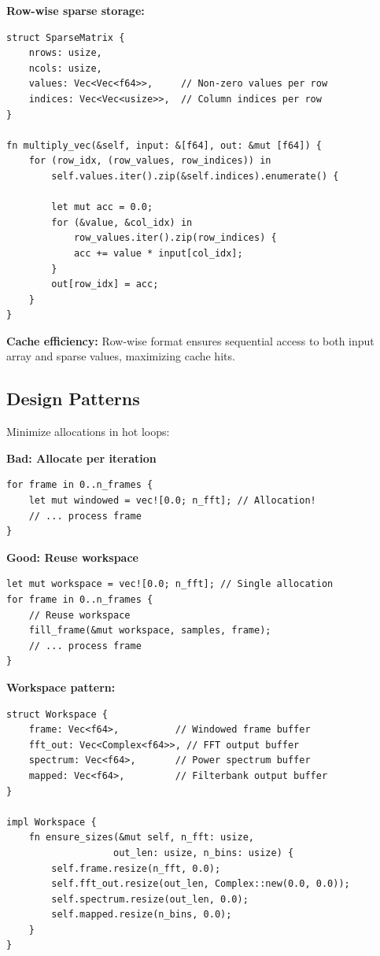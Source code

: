 \textbf{Row-wise sparse storage:}

\begin{lstlisting}[caption={Sparse matrix layout and filterbank multiply}]
struct SparseMatrix {
    nrows: usize,
    ncols: usize,
    values: Vec<Vec<f64>>,     // Non-zero values per row
    indices: Vec<Vec<usize>>,  // Column indices per row
}

fn multiply_vec(&self, input: &[f64], out: &mut [f64]) {
    for (row_idx, (row_values, row_indices)) in
        self.values.iter().zip(&self.indices).enumerate() {

        let mut acc = 0.0;
        for (&value, &col_idx) in
            row_values.iter().zip(row_indices) {
            acc += value * input[col_idx];
        }
        out[row_idx] = acc;
    }
}
\end{lstlisting}

\textbf{Cache efficiency:} Row-wise format ensures sequential access
to both input array and sparse values, maximizing cache hits.

\subsection{ Design Patterns}

Minimize allocations in hot loops:

\textbf{Bad: Allocate per iteration}
\begin{lstlisting}[caption={Per-frame allocation — wasteful hot-loop pattern}]
for frame in 0..n_frames {
    let mut windowed = vec![0.0; n_fft]; // Allocation!
    // ... process frame
}
\end{lstlisting}

\textbf{Good: Reuse workspace}
\begin{lstlisting}[caption={Pre-allocated workspace reused across frames}]
let mut workspace = vec![0.0; n_fft]; // Single allocation
for frame in 0..n_frames {
    // Reuse workspace
    fill_frame(&mut workspace, samples, frame);
    // ... process frame
}
\end{lstlisting}

\textbf{Workspace pattern:}

\begin{lstlisting}[caption={Full workspace struct with resizable buffers}]
struct Workspace {
    frame: Vec<f64>,          // Windowed frame buffer
    fft_out: Vec<Complex<f64>>, // FFT output buffer
    spectrum: Vec<f64>,       // Power spectrum buffer
    mapped: Vec<f64>,         // Filterbank output buffer
}

impl Workspace {
    fn ensure_sizes(&mut self, n_fft: usize,
                   out_len: usize, n_bins: usize) {
        self.frame.resize(n_fft, 0.0);
        self.fft_out.resize(out_len, Complex::new(0.0, 0.0));
        self.spectrum.resize(out_len, 0.0);
        self.mapped.resize(n_bins, 0.0);
    }
}
\end{lstlisting}


